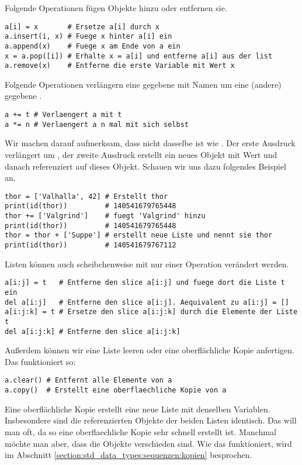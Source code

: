 Folgende Operationen fügen Objekte hinzu oder entfernen sie.
\begin{lstlisting}
a[i] = x       # Ersetze a[i] durch x
a.insert(i, x) # Fuege x hinter a[i] ein
a.append(x)    # Fuege x am Ende von a ein
x = a.pop([i]) # Erhalte x = a[i] und entferne a[i] aus der list
a.remove(x)    # Entferne die erste Variable mit Wert x
\end{lstlisting}

Folgende Operationen verlängern eine gegebene  mit Namen  um eine (andere) gegebene .
\begin{lstlisting}
a += t # Verlaengert a mit t
a *= n # Verlaengert a n mal mit sich selbst
\end{lstlisting}
Wir machen darauf aufmerksam, dass  nicht dasselbe ist wie .
Der erste Ausdruck verlängert  um , der zweite Ausdruck erstellt ein neues Objekt mit Wert  und danach referenziert  auf dieses Objekt.
Schauen wir uns dazu folgendes Beispiel an.
\begin{lstlisting}
thor = ['Valhalla', 42] # Erstellt thor
print(id(thor))         # 140541679765448
thor += ['Valgrind']    # fuegt 'Valgrind' hinzu
print(id(thor))         # 140541679765448
thor = thor + ['Suppe'] # erstellt neue Liste und nennt sie thor
print(id(thor))         # 140541679767112
\end{lstlisting}

Listen können auch scheibchenweise mit nur einer Operation verändert werden.
\begin{lstlisting}
a[i:j] = t   # Entferne den slice a[i:j] und fuege dort die Liste t ein
del a[i:j]   # Entferne den slice a[i:j]. Aequivalent zu a[i:j] = []
a[i:j:k] = t # Ersetze den slice a[i:j:k] durch die Elemente der Liste t
del a[i:j:k] # Entferne den slice a[i:j:k]
\end{lstlisting}

Außerdem können wir eine Liste leeren oder eine oberflächliche Kopie anfertigen.
Das funktioniert so:
\begin{lstlisting}
a.clear() # Entfernt alle Elemente von a
a.copy()  # Erstellt eine oberflaechliche Kopie von a
\end{lstlisting}
Eine oberflächliche Kopie erstellt eine neue Liste mit denselben Variablen.
Insbesondere sind die referenzierten Objekte der beiden Listen identisch.
Das will man oft, da so eine oberflaechliche Kopie sehr schnell erstellt ist.
Manchmal möchte man aber, dass die Objekte verschieden sind.
Wie das funktioniert, wird im Abschnitt \ref{section:std_data_types:sequenzen:kopien} besprochen.


